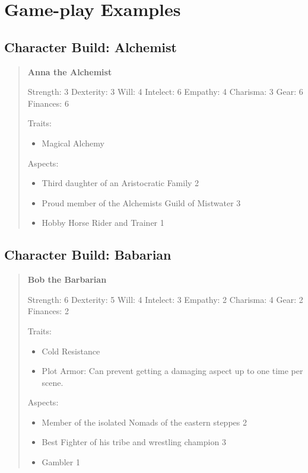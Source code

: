 \documentclass[11pt]{article}
\begin{document}
{\section{Game-play Examples}
\label{sec:org9c33942}
\subsection{Character Build: Alchemist}
\label{sec:org0dd2e0a}

\begin{quote}
\textbf{Anna the Alchemist}

Strength: 3
Dexterity: 3
Will: 4
Intelect: 6
Empathy: 4
Charisma: 3
Gear: 6
Finances: 6

Traits:
\begin{itemize}
\item Magical Alchemy
\end{itemize}

Aspects:
\begin{itemize}
\item Third daughter of an Aristocratic Family 2
\item Proud member of the Alchemists Guild of Mistwater 3
\item Hobby Horse Rider and Trainer 1
\end{itemize}
\end{quote}

\subsection{Character Build: Babarian}
\label{sec:orge965da5}

\begin{quote}
\textbf{Bob the Barbarian}

Strength: 6
Dexterity: 5
Will: 4
Intelect: 3
Empathy: 2
Charisma: 4
Gear: 2
Finances: 2

Traits:
\begin{itemize}
\item Cold Resistance
\item Plot Armor: Can prevent getting a damaging aspect up to one time per scene.
\end{itemize}

Aspects:
\begin{itemize}
\item Member of the isolated Nomads of the eastern steppes 2
\item Best Fighter of his tribe and wrestling champion 3
\item Gambler 1
\end{itemize}
\end{quote}

}
\end{document}

